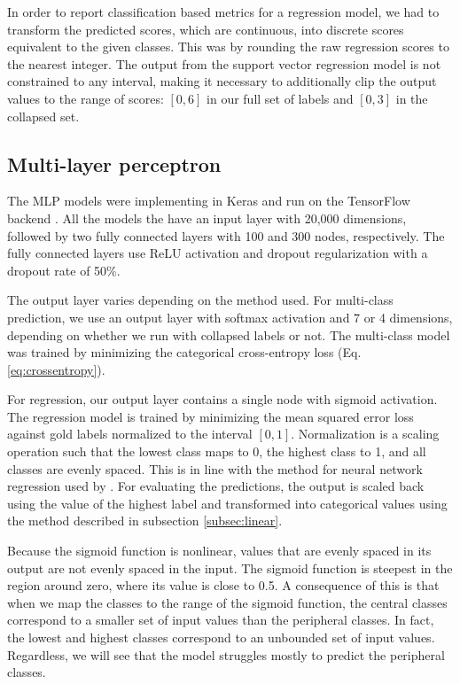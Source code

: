 In order to report classification based metrics for a regression model, we
had to transform the predicted scores, which are continuous, into discrete
scores equivalent to the given classes. This was by rounding the raw
regression scores to the nearest integer. The output from the support vector
regression model is not constrained to any interval, making it necessary to
additionally clip the output values to the range of scores: $[0,6]$ in our
full set of labels and $[0,3]$ in the collapsed set.


\subsection{Multi-layer perceptron}
\label{subsec:mlp}

The MLP models were implementing in Keras \autocite{keras} and run on the
TensorFlow backend \autocite{tensorflow}. All the models the have an input
layer with 20,000 dimensions, followed by two fully connected layers with 100
and 300 nodes, respectively. The fully connected layers use \ac{ReLU}
activation and dropout regularization with a dropout rate of 50\%.

The output layer varies depending on the method used. For multi-class
prediction, we use an output layer with softmax activation and 7 or 4
dimensions, depending on whether we run with collapsed labels or not. The
multi-class model was trained by minimizing the categorical cross-entropy
loss (Eq. \ref{eq:crossentropy}).

For regression, our output layer contains a single node with sigmoid
activation. The regression model is trained by minimizing the mean squared
error loss against gold labels normalized to the interval $[0, 1]$.
Normalization is a scaling operation such that the lowest class maps to 0,
the highest class to 1, and all classes are evenly spaced. This is in line
with the method for neural network regression used by \textcite{taghipour16}.
For evaluating the predictions, the output is scaled back using the value of
the highest label and transformed into categorical values using the method
described in subsection \ref{subsec:linear}.

Because the sigmoid function is nonlinear, values that are evenly spaced in
its output are not evenly spaced in the input. The sigmoid function is
steepest in the region around zero, where its value is close to 0.5. A
consequence of this is that when we map the classes to the range of the
sigmoid function, the central classes correspond to a smaller set of input
values than the peripheral classes. In fact, the lowest and highest classes
correspond to an unbounded set of input values. Regardless, we will see that
the model struggles mostly to predict the peripheral classes.

